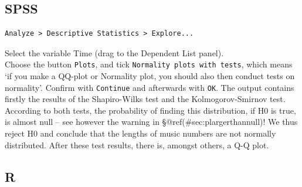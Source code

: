 \documentclass[
]{book}
\newenvironment{Shaded}{\begin{snugshade}}{\end{snugshade}}
\newcommand{\CommentTok}[1]{\textcolor[rgb]{0.56,0.35,0.01}{\textit{#1}}}
\newcommand{\DataTypeTok}[1]{\textcolor[rgb]{0.13,0.29,0.53}{#1}}
\newcommand{\DecValTok}[1]{\textcolor[rgb]{0.00,0.00,0.81}{#1}}
\newcommand{\KeywordTok}[1]{\textcolor[rgb]{0.13,0.29,0.53}{\textbf{#1}}}
\newcommand{\NormalTok}[1]{#1}
\newcommand{\OperatorTok}[1]{\textcolor[rgb]{0.81,0.36,0.00}{\textbf{#1}}}
\newcommand{\OtherTok}[1]{\textcolor[rgb]{0.56,0.35,0.01}{#1}}
\newcommand{\StringTok}[1]{\textcolor[rgb]{0.31,0.60,0.02}{#1}}
\begin{document}
\hypertarget{spss-4}{%
\subsection{SPSS}\label{spss-4}}

\begin{verbatim}
Analyze > Descriptive Statistics > Explore...
\end{verbatim}

Select the variable Time (drag to the Dependent List panel).\\
Choose the button \texttt{Plots}, and tick \texttt{Normality\ plots\ with\ tests}, which
means `if you make a QQ-plot or Normality plot, you should also then conduct
tests on normality'.
Confirm with \texttt{Continue} and afterwards with \texttt{OK}. The output contains
firstly the results of the Shapiro-Wilks test and the
Kolmogorov-Smirnov test. According to both tests, the probability of finding
this distribution, if H0 is true, is almost null -- see however the
warning in
§@ref(\#sec:plargerthannull)! We thus reject H0 and conclude that
the lengths of music numbers are not normally distributed. After these
test results, there is, amongst others, a Q-Q plot.

\hypertarget{r-5}{%
\subsection{R}\label{r-5}}

\begin{Shaded}
\end{Shaded}

\begin{Shaded}
\end{Shaded}
\end{document}
